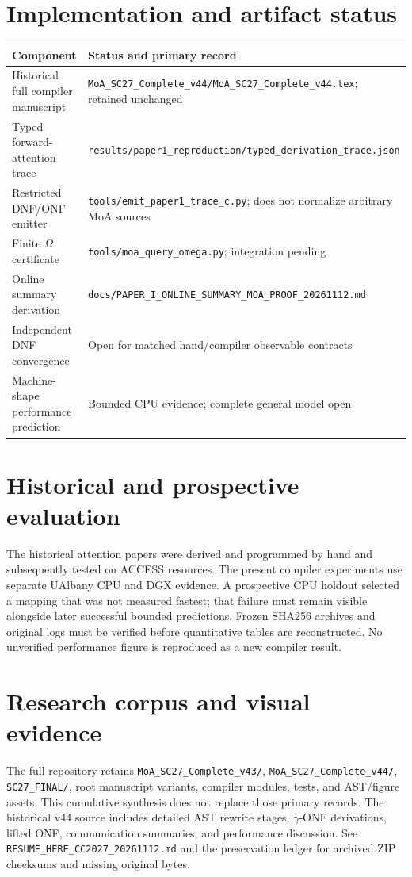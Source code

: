 \documentclass[11pt]{article}
\begin{document}
\section{Implementation and artifact status}
\begin{longtable}{p{.36\linewidth}p{.52\linewidth}}
\toprule
Component & Status and primary record\\\midrule
Historical full compiler manuscript & \texttt{MoA\_SC27\_Complete\_v44/MoA\_SC27\_Complete\_v44.tex}; retained unchanged\\
Typed forward-attention trace & \texttt{results/paper1\_reproduction/typed\_derivation\_trace.json}\\
Restricted DNF/ONF emitter & \texttt{tools/emit\_paper1\_trace\_c.py}; does not normalize arbitrary MoA sources\\
Finite $\Omega$ certificate & \texttt{tools/moa\_query\_omega.py}; integration pending\\
Online summary derivation & \texttt{docs/PAPER\_I\_ONLINE\_SUMMARY\_MOA\_PROOF\_20261112.md}\\
Independent DNF convergence & Open for matched hand/compiler observable contracts\\
Machine-shape performance prediction & Bounded CPU evidence; complete general model open\\
\bottomrule
\end{longtable}

\section{Historical and prospective evaluation}
The historical attention papers were derived and programmed by hand and subsequently tested on ACCESS resources. The present compiler experiments use separate UAlbany CPU and DGX evidence. A prospective CPU holdout selected a mapping that was not measured fastest; that failure must remain visible alongside later successful bounded predictions. Frozen SHA256 archives and original logs must be verified before quantitative tables are reconstructed. No unverified performance figure is reproduced as a new compiler result.

\section{Research corpus and visual evidence}
The full repository retains \texttt{MoA\_SC27\_Complete\_v43/}, \texttt{MoA\_SC27\_Complete\_v44/}, \texttt{SC27\_FINAL/}, root manuscript variants, compiler modules, tests, and AST/figure assets. This cumulative synthesis does not replace those primary records. The historical v44 source includes detailed AST rewrite stages, $\gamma$-ONF derivations, lifted ONF, communication summaries, and performance discussion. See \texttt{RESUME\_HERE\_CC2027\_20261112.md} and the preservation ledger for archived ZIP checksums and missing original bytes.
\end{document}
